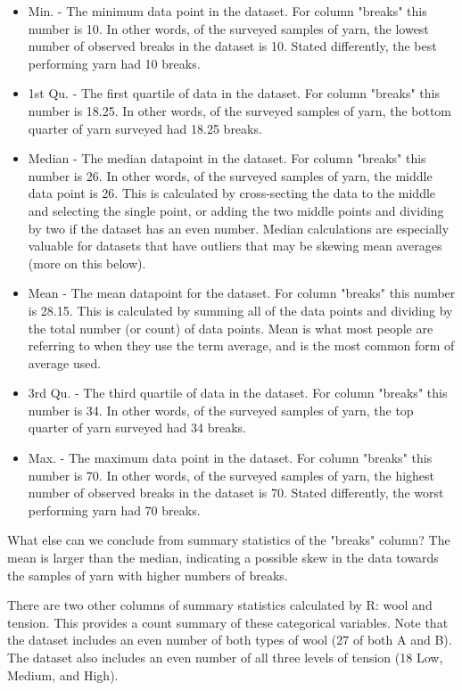 \begin{itemize}
 \item Min. - The minimum data point in the dataset. For column "breaks" this number is 10. In other words, of the surveyed samples of yarn, the lowest number of observed breaks in the dataset is 10. Stated differently, the best performing yarn had 10 breaks.
 \item 1st Qu. - The first quartile of data in the dataset. For column "breaks" this number is 18.25. In other words, of the surveyed samples of yarn, the bottom quarter of yarn surveyed had 18.25 breaks.
 \item Median - The median datapoint in the dataset. For column "breaks" this number is 26. In other words, of the surveyed samples of yarn, the middle data point is 26. This is calculated by cross-secting the data to the middle and selecting the single point, or adding the two middle points and dividing by two if the dataset has an even number. Median calculations are especially valuable for datasets that have outliers that may be skewing mean averages (more on this below).
 \item Mean - The mean datapoint for the dataset. For column "breaks" this number is 28.15. This is calculated by summing all of the data points and dividing by the total number (or count) of data points. Mean is what most people are referring to when they use the term average, and is the most common form of average used.
 \item 3rd Qu. - The third quartile of data in the dataset. For column "breaks" this number is 34. In other words, of the surveyed samples of yarn, the top quarter of yarn surveyed had 34 breaks.
 \item Max. - The maximum data point in the dataset. For column "breaks" this number is 70. In other words, of the surveyed samples of yarn, the highest number of observed breaks in the dataset is 70. Stated differently, the worst performing yarn had 70 breaks.
\end{itemize}

What else can we conclude from summary statistics of the "breaks" column? The mean is larger than the median, indicating a possible skew in the data towards the samples of yarn with higher numbers of breaks.

There are two other columns of summary statistics calculated by R: wool and tension. This provides a count summary of these categorical variables. Note that the dataset includes an even number of both types of wool (27 of both A and B). The dataset also includes an even number of all three levels of tension (18 Low, Medium, and High).

